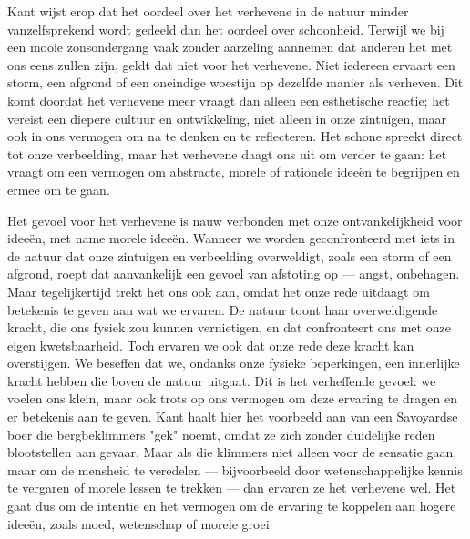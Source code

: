 \begin{mdframed}[leftmargin=0pt,rightmargin=0pt,backgroundcolor=blue!6,linecolor=white,innertopmargin=6pt,innerbottommargin=6pt]

Kant wijst erop dat het oordeel over het verhevene in de natuur minder vanzelfsprekend wordt gedeeld dan het oordeel over schoonheid. Terwijl we bij een mooie zonsondergang vaak zonder aarzeling aannemen dat anderen het met ons eens zullen zijn, geldt dat niet voor het verhevene. Niet iedereen ervaart een storm, een afgrond of een oneindige woestijn op dezelfde manier als verheven. Dit komt doordat het verhevene meer vraagt dan alleen een esthetische reactie; het vereist een diepere cultuur en ontwikkeling, niet alleen in onze zintuigen, maar ook in ons vermogen om na te denken en te reflecteren. Het schone spreekt direct tot onze verbeelding, maar het verhevene daagt ons uit om verder te gaan: het vraagt om een vermogen om abstracte, morele of rationele ideeën te begrijpen en ermee om te gaan.

Het gevoel voor het verhevene is nauw verbonden met onze ontvankelijkheid voor ideeën, met name morele ideeën. Wanneer we worden geconfronteerd met iets in de natuur dat onze zintuigen en verbeelding overweldigt, zoals een storm of een afgrond, roept dat aanvankelijk een gevoel van afstoting op — angst, onbehagen. Maar tegelijkertijd trekt het ons ook aan, omdat het onze rede uitdaagt om betekenis te geven aan wat we ervaren. De natuur toont haar overweldigende kracht, die ons fysiek zou kunnen vernietigen, en dat confronteert ons met onze eigen kwetsbaarheid. Toch ervaren we ook dat onze rede deze kracht kan overstijgen. We beseffen dat we, ondanks onze fysieke beperkingen, een innerlijke kracht hebben die boven de natuur uitgaat. Dit is het verheffende gevoel: we voelen ons klein, maar ook trots op ons vermogen om deze ervaring te dragen en er betekenis aan te geven. Kant haalt hier het voorbeeld aan van een Savoyardse boer die bergbeklimmers "gek" noemt, omdat ze zich zonder duidelijke reden blootstellen aan gevaar. Maar als die klimmers niet alleen voor de sensatie gaan, maar om de mensheid te veredelen — bijvoorbeeld door wetenschappelijke kennis te vergaren of morele lessen te trekken — dan ervaren ze het verhevene wel. Het gaat dus om de intentie en het vermogen om de ervaring te koppelen aan hogere ideeën, zoals moed, wetenschap of morele groei.


\end{mdframed}
